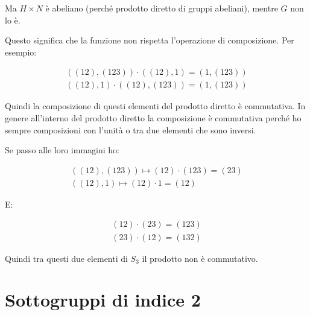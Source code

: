 \begin{soluzione}
	Ma $H \times N$ è abeliano (perché prodotto diretto di gruppi abeliani), mentre $G$ non lo è.
	
	Questo significa che la funzione non rispetta l'operazione di composizione. Per esempio:
	
	\begin{gather}
		((12), (123)) \cdot ((12), 1) = (1, (123)) \\
		((12), 1) \cdot ((12), (123)) = (1, (123))
	\end{gather}

	Quindi la composizione di questi elementi del prodotto diretto è commutativa. In genere all'interno del prodotto diretto la composizione è commutativa perché ho sempre composizioni con l'unità o tra due elementi che sono inversi.
	
	Se passo alle loro immagini ho:
	
	\begin{gather}
		((12), (123)) \longmapsto (12) \cdot (123) = (23) \\
		((12), 1) \longmapsto (12) \cdot 1 = (12)
	\end{gather}

	E:
	
	\begin{gather}
		(12) \cdot (23) = (123) \\
		(23) \cdot (12) = (132)
	\end{gather}

	Quindi tra questi due elementi di $S_3$ il prodotto non è commutativo.
	
\end{soluzione}

\section{Sottogruppi di indice 2}

